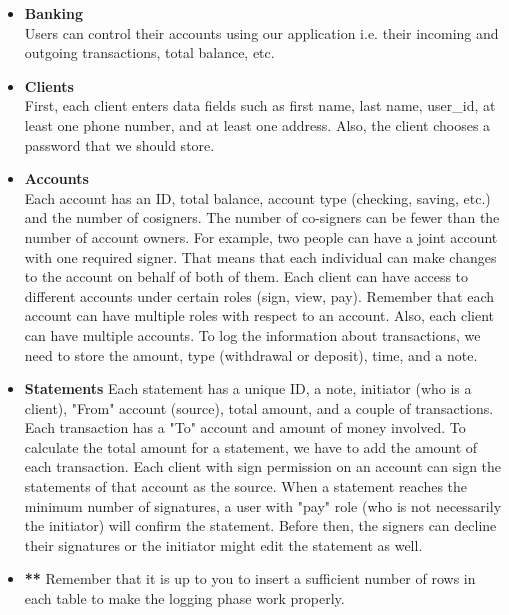 \documentclass{homework}
\begin{document}
\begin{itemize}
    \item \textbf{Banking}\\
    Users can control their accounts using our application i.e. their incoming and outgoing transactions, total balance, etc.
    
    \item \textbf{Clients}\\
    First, each client enters data fields such as first name, last name, user\_id, at least one phone number, and at least one address. Also, the client chooses a password that we should store. 

    \item \textbf{Accounts}\\
    Each account has an ID, total balance, account type (checking, saving, etc.) and the number of cosigners. The number of co-signers can be fewer than the number of account owners. For example, two people can have a joint account with one required signer. That means that each individual can make changes to the account on behalf of both of them. Each client can have access to different accounts under certain roles (sign, view, pay). Remember that each account can have multiple roles with respect to an account.
    Also, each client can have multiple accounts. To log the information about transactions, we need to store the amount, type (withdrawal or deposit), time, and a note.

    \item \textbf{Statements}
    Each statement has a unique ID, a note, initiator (who is a client), "From" account (source), total amount, and a couple of transactions. Each transaction has a "To" account and amount of money involved. To calculate the total amount for a statement, we have to add the amount of each transaction.
    Each client with sign permission on an account can sign the statements of that account as the source. When a statement reaches the minimum number of signatures, a user with "pay" role (who is not necessarily the initiator) will confirm the statement. Before then, the signers can decline their signatures or the initiator might edit the statement as well.

    \item \textbf{**} Remember that it is up to you to insert a sufficient number of rows in each table to make the logging phase work properly.
    
\end{itemize}
\end{document}
